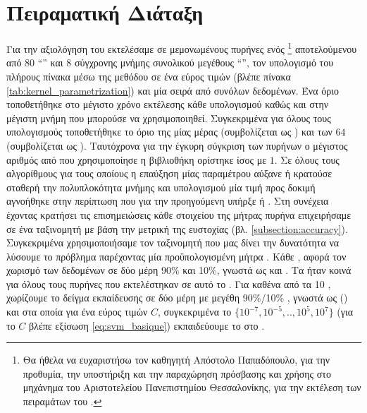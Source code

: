 \section{Πειραματική Διάταξη}
\label{sec:es}
Για την αξιολόγηση του  εκτελέσαμε σε μεμονωμένους πυρήνες ενός \footnote{Θα ήθελα να ευχαριστήσω τον καθηγητή Απόστολο Παπαδόπουλο, για την προθυμία, την υποστήριξη και την παραχώρηση πρόσβασης και χρήσης στο μηχάνημα  του Αριστοτελείου Πανεπιστημίου Θεσσαλονίκης, για την εκτέλεση των πειραμάτων του .} αποτελούμενου από 80 ``'' και 8  σύγχρονης μνήμης  συνολικού μεγέθους ``'', τον υπολογισμό του πλήρους  πίνακα μέσω της μεθόδου  σε ένα εύρος τιμών (βλέπε πίνακα \ref{tab:kernel_parametrization}) και μία σειρά από συνόλων δεδομένων.
Ένα όριο τοποθετήθηκε στο μέγιστο χρόνο εκτέλεσης κάθε υπολογισμού καθώς και στην μέγιστη μνήμη  που μπορούσε να χρησιμοποιηθεί. 
Συγκεκριμένα για όλους τους υπολογισμούς τοποθετήθηκε το όριο της μίας μέρας (συμβολίζεται ως ) και των $64$ (συμβολίζεται ως ).
Ταυτόχρονα για την έγκυρη σύγκριση των πυρήνων ο μέγιστος αριθμός από  που χρησιμοποίησε η βιβλιοθήκη  ορίστηκε ίσος με $1$.
Σε όλους τους αλγορίθμους για τους οποίους η επαύξηση μίας παραμέτρου αύξανε ή κρατούσε σταθερή την πολυπλοκότητα μνήμης και υπολογισμού μία τιμή προς δοκιμή αγνοήθηκε στην περίπτωση που για την προηγούμενη υπήρξε  ή .
Στη συνέχεια έχοντας κρατήσει τις επισημειώσεις κάθε στοιχείου της μήτρας πυρήνα επιχειρήσαμε  σε ένα ταξινομητή  με βάση την μετρική της ευστοχίας (βλ. \ref{subsection:accuracy}).
Συγκεκριμένα χρησιμοποιήσαμε τον ταξινομητή  που μας δίνει την δυνατότητα να λύσουμε το πρόβλημα  παρέχοντας μία προϋπολογισμένη μήτρα .
Κάθε , αφορά τον χωρισμό των δεδομένων σε δύο μέρη 90\% και 10\%, γνωστά ως  και .
Τα  ήταν κοινά για όλους τους πυρήνες που εκτελέστηκαν σε αυτό το .
Για καθένα από τα 10 , χωρίζουμε το δείγμα εκπαίδευσης σε δύο μέρη με μεγέθη 90\%/10\% , γνωστά ως () και στα οποία για ένα εύρος τιμών $C$, συγκεκριμένα το $\{10^{-7}, 10^{-5}, .., 10^{5}, 10^{7}\}$ (για το $C$ βλέπε εξίσωση \ref{eq:svm_basique}) εκπαιδεύουμε το  στο .
